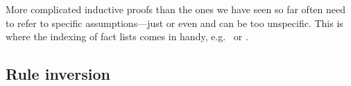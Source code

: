 \begin{isabellebody}
\begin{isamarkuptext}
More complicated inductive proofs than the ones we have seen so far
often need to refer to specific assumptions---just  or even
 and  can be too unspecific.
This is where the indexing of fact lists comes in handy, e.g.\
 or .

\subsection{Rule inversion}


\end{isamarkuptext}
\end{isabellebody}
